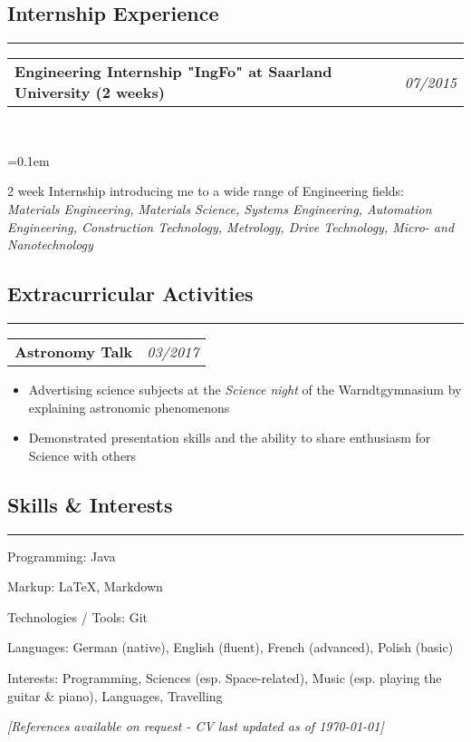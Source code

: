 \documentclass[10pt,letterpaper]{article}
\makeatletter
\newcommand{\headerrow}[2]
{\begin{tabular*}{\linewidth}{l@{\extracolsep{\fill}}r}
	#1 &
	#2 \\
\end{tabular*}}
\makeatother
\begin{document}
\subsection*{Internship Experience}
\hrule
\vspace{0.4em}

\noindent
\headerrow{\textbf{Engineering Internship "IngFo" at Saarland University (2 weeks)}}{\emph{07/2015}}
\\
\vspace{-1.6em}
\begin{itemize*}
    \parskip=0.1em
    \item 2 week Internship introducing me to a wide range of Engineering fields: \\
    \emph{Materials Engineering, Materials Science, Systems Engineering, Automation Engineering, Construction Technology, Metrology, Drive Technology, Micro- and Nanotechnology}
\end{itemize*}


\subsection*{Extracurricular Activities}
\hrule
\vspace{0.4em}

\noindent
\headerrow{\textbf{Astronomy Talk}}{\emph{03/2017}}
\vspace{-1.6em}
\begin{itemize}
    \setlength\itemsep{0em}
    \item Advertising science subjects at the \emph{Science night} of the Warndtgymnasium by explaining astronomic phenomenons
    \item Demonstrated presentation skills and the ability to share enthusiasm for Science with others
\end{itemize}



\subsection*{Skills \& Interests}
\hrule
\vspace{0.4em}
\begin{description*}
	\item[Programming:]
	Java%
    	\item[Markup:]
    	\LaTeX, Markdown
	\item[Technologies / Tools:]
	Git
	\item[Languages:]
	German (native), English (fluent), French (advanced), Polish (basic)
   	\item[Interests:]
	Programming, Sciences (esp. Space-related), Music (esp. playing the guitar \& piano), Languages, Travelling
\end{description*}



\hfill \small \textit{[References available on request - CV last updated as of {\today}]}
\end{document}
